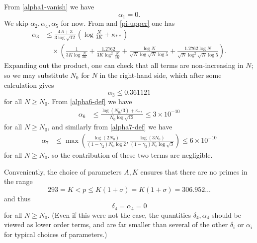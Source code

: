 \documentclass[10pt,a4paper,reqno]{amsart}
\numberwithin{equation}{section}
\theoremstyle{plain}
\theoremstyle{definition}
\begin{document}
From \eqref{alpha1-vanish} we have
$$ \alpha_1 = 0.$$
We skip $\alpha_2, \alpha_4, \alpha_5$ for now.  From  and \eqref{pi-upper} one has
\begin{align*}
  \alpha_3 &\leq \frac{4A+3}{3\log \sqrt{12}} \left(\log \frac{N}{3K} + \kappa_{**}\right)  \\
&\quad \times \left(
  \frac{1}{3K \log\frac{N}{3K}} + \frac{1.2762}{3K \log^2\frac{N}{3K}}
  + \frac{\log N}{\sqrt{N} \log \sqrt{N}\log 5 } + \frac{1.2762 \log N}{\sqrt{N} \log^2 \sqrt{N}\log 5 } \right).
\end{align*}
Expanding out the product, one can check that all terms are non-increasing in $N$; so we may substitute $N_0$ for $N$ in the right-hand side, which after some calculation gives
$$ \alpha_3 \leq 0.361121$$
for all $N \geq N_0$.
From \eqref{alpha6-def} we have
\begin{align*}
   \alpha_6 &\leq \frac{\log(N_0/3) + \kappa_{**}}{N_0 \log \sqrt{12}} \leq 3 \times 10^{-10}
\end{align*}
for all $N \geq N_0$, and similarly from \eqref{alpha7-def} we have
\begin{align*}
\alpha_7 &\leq \max\left( \frac{\log(2N_0)}{(1-\gamma_2)N_0\log 2},  \frac{\log(3N_0)}{(1-\gamma_3)N_0\log \sqrt{3}}\right) \leq 6 \times 10^{-10}
\end{align*}
for all $N \geq N_0$.
so the contribution of these two terms are negligible.

Conveniently, the choice of parameters $A,K$ ensures that there are no primes in the range
$$ 293 = K < p \leq K(1+\sigma) = K(1+\sigma)=306.952\dots$$
and thus
$$ \delta_4=\alpha_4 = 0$$
for all $N \geq N_0$. (Even if this were not the case, the quantities $\delta_4,\alpha_4$ should be viewed as lower order terms, and are far smaller than several of the other $\delta_i$ or $\alpha_i$ for typical choices of parameters.)
\end{document}
